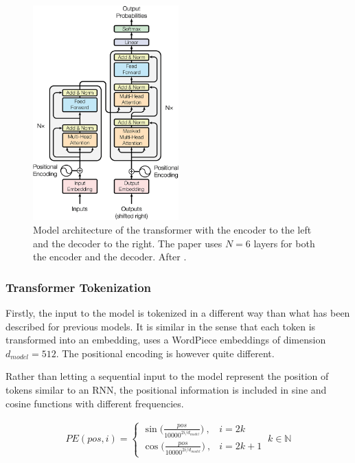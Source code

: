 \begin{figure}[H]
    \centering
    \includegraphics[width=0.5\textwidth]{Figures/The-Transformer-model-architecture.png}
    \caption{Model architecture of the transformer with the encoder to the left and the decoder to the right. The paper uses $N = 6$ layers for both the encoder and the decoder. After \citet{NIPS2017_7181}.}
    \label{fig:tr_arch}
\end{figure}

\subsubsection{Transformer Tokenization}

Firstly, the input to the model is tokenized in a different way than what has been described for previous models. It is similar in the sense that each token is transformed into an embedding, \citet{NIPS2017_7181} uses a WordPiece embeddings of dimension $d_{model} = 512$. The positional encoding is however quite different. 

Rather than letting a sequential input to the model represent the position of tokens similar to an RNN, the positional information is included in sine and cosine functions with different frequencies. 

\begin{align}
    PE(pos,i) = \begin{cases}
    \sin\Big(\frac{pos}{10000^{2i/d_{model}}}\Big) \ , & i = 2k \\
    \cos\Big(\frac{pos}{10000^{2i/d_{model}}}\Big) \ , & i = 2k + 1 
    \end{cases} \   k \in \mathbb{N}
    \label{eq:posid}
\end{align}

